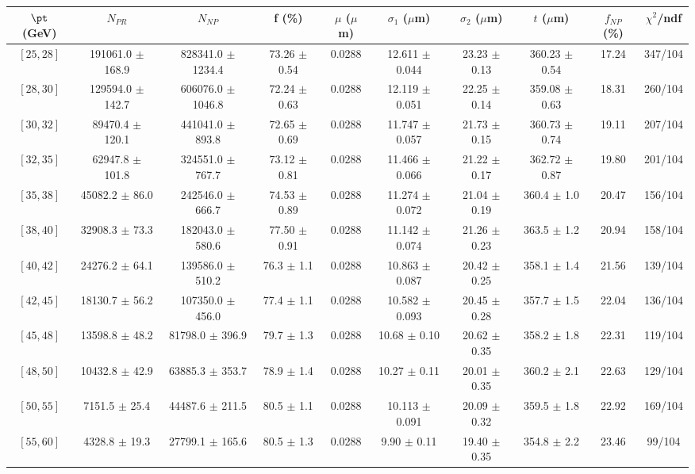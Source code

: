 \begin{tabular}{c||c|c|c|c|c|c|c||c|c}
$\pt$ (GeV) & $N_{PR}$ & $N_{NP}$ & f (\%) & $\mu$ ($\mu$m) & $\sigma_1$ ($\mu$m) & $\sigma_2$ ($\mu$m)  & $t$ ($\mu$m) & $f_{NP}$ (\%) & $\chi^2$/ndf \\
\hline
$[25, 28]$ & 191061.0 $\pm$ 168.9 & 828341.0 $\pm$ 1234.4 & 73.26 $\pm$ 0.54 & 0.0288 & 12.611 $\pm$ 0.044 & 23.23 $\pm$ 0.13 & 360.23 $\pm$ 0.54 & 17.24 & 347/104\\
$[28, 30]$ & 129594.0 $\pm$ 142.7 & 606076.0 $\pm$ 1046.8 & 72.24 $\pm$ 0.63 & 0.0288 & 12.119 $\pm$ 0.051 & 22.25 $\pm$ 0.14 & 359.08 $\pm$ 0.63 & 18.31 & 260/104\\
$[30, 32]$ & 89470.4 $\pm$ 120.1 & 441041.0 $\pm$ 893.8 & 72.65 $\pm$ 0.69 & 0.0288 & 11.747 $\pm$ 0.057 & 21.73 $\pm$ 0.15 & 360.73 $\pm$ 0.74 & 19.11 & 207/104\\
$[32, 35]$ & 62947.8 $\pm$ 101.8 & 324551.0 $\pm$ 767.7 & 73.12 $\pm$ 0.81 & 0.0288 & 11.466 $\pm$ 0.066 & 21.22 $\pm$ 0.17 & 362.72 $\pm$ 0.87 & 19.80 & 201/104\\
$[35, 38]$ & 45082.2 $\pm$ 86.0 & 242546.0 $\pm$ 666.7 & 74.53 $\pm$ 0.89 & 0.0288 & 11.274 $\pm$ 0.072 & 21.04 $\pm$ 0.19 & 360.4 $\pm$ 1.0 & 20.47 & 156/104\\
$[38, 40]$ & 32908.3 $\pm$ 73.3 & 182043.0 $\pm$ 580.6 & 77.50 $\pm$ 0.91 & 0.0288 & 11.142 $\pm$ 0.074 & 21.26 $\pm$ 0.23 & 363.5 $\pm$ 1.2 & 20.94 & 158/104\\
$[40, 42]$ & 24276.2 $\pm$ 64.1 & 139586.0 $\pm$ 510.2 & 76.3 $\pm$ 1.1 & 0.0288 & 10.863 $\pm$ 0.087 & 20.42 $\pm$ 0.25 & 358.1 $\pm$ 1.4 & 21.56 & 139/104\\
$[42, 45]$ & 18130.7 $\pm$ 56.2 & 107350.0 $\pm$ 456.0 & 77.4 $\pm$ 1.1 & 0.0288 & 10.582 $\pm$ 0.093 & 20.45 $\pm$ 0.28 & 357.7 $\pm$ 1.5 & 22.04 & 136/104\\
$[45, 48]$ & 13598.8 $\pm$ 48.2 & 81798.0 $\pm$ 396.9 & 79.7 $\pm$ 1.3 & 0.0288 & 10.68 $\pm$ 0.10 & 20.62 $\pm$ 0.35 & 358.2 $\pm$ 1.8 & 22.31 & 119/104\\
$[48, 50]$ & 10432.8 $\pm$ 42.9 & 63885.3 $\pm$ 353.7 & 78.9 $\pm$ 1.4 & 0.0288 & 10.27 $\pm$ 0.11 & 20.01 $\pm$ 0.35 & 360.2 $\pm$ 2.1 & 22.63 & 129/104\\
$[50, 55]$ & 7151.5 $\pm$ 25.4 & 44487.6 $\pm$ 211.5 & 80.5 $\pm$ 1.1 & 0.0288 & 10.113 $\pm$ 0.091 & 20.09 $\pm$ 0.32 & 359.5 $\pm$ 1.8 & 22.92 & 169/104\\
$[55, 60]$ & 4328.8 $\pm$ 19.3 & 27799.1 $\pm$ 165.6 & 80.5 $\pm$ 1.3 & 0.0288 & 9.90 $\pm$ 0.11 & 19.40 $\pm$ 0.35 & 354.8 $\pm$ 2.2 & 23.46 & 99/104\\

\end{tabular}
